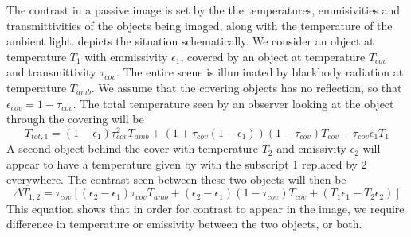 The contrast in a passive image is set by the the temperatures, emmisivities and transmittivities of the objects being imaged, along with the temperature of the ambient light.
 depicts the situation schematically.
We consider an object at temperature $T_{1}$ with emmissivity $\epsilon_1$, covered by an object at temperature $T_{cov}$ and transmittivity $\tau_{cov}$.
The entire scene is illuminated by blackbody radiation at temperature $T_{amb}$.
We assume that the covering objects has no reflection, so that $\epsilon_{cov} = 1 - \tau_{cov}$.
The total temperature seen by an observer looking at the object through the covering will be
\begin{equation} \label{eqn:ch1-t-tot}
  T_{tot,1} = (1 - \epsilon_{1}) \tau_{cov}^2 T_{amb} + 
           (1 + \tau_{cov}(1 - \epsilon_{1}))(1-\tau_{cov}) T_{cov} + 
           \tau_{cov} \epsilon_{1} T_1
\end{equation}
A second object behind the cover with temperature $T_2$ and emissivity $\epsilon_2$ will appear to have a temperature given by  with the subscript 1 replaced by 2 everywhere.
The contrast seen between these two objects will then be
\begin{equation} \label{eqn:ch1-delta-t}
  \Delta T_{1,2} = \tau_{cov} \left[ (\epsilon_2 - \epsilon_1) \tau_{cov} T_{amb} + 
                                    (\epsilon_2 - \epsilon_1) (1-\tau_{cov}) T_{cov} + 
                                    (T_1 \epsilon_1 - T_2 \epsilon_2) \right]
\end{equation}
This equation shows that in order for contrast to appear in the image, we require difference in temperature or emissivity between the two objects, or both.

